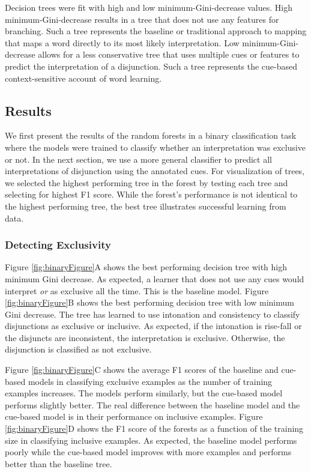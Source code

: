 \documentclass[
  english,
  ,man,floatsintext]{apa6}
\begin{document}
Decision trees were fit with high and low minimum-Gini-decrease values. High minimum-Gini-decrease results in a tree that does not use any features for branching. Such a tree represents the baseline or traditional approach to mapping that maps a word directly to its most likely interpretation. Low minimum-Gini-decrease allows for a less conservative tree that uses multiple cues or features to predict the interpretation of a disjunction. Such a tree represents the cue-based context-sensitive account of word learning.

\hypertarget{results-1}{%
\subsection{Results}\label{results-1}}

We first present the results of the random forests in a binary classification task where the models were trained to classify whether an interpretation was exclusive or not. In the next section, we use a more general classifier to predict all interpretations of disjunction using the annotated cues. For visualization of trees, we selected the highest performing tree in the forest by testing each tree and selecting for highest F1 score. While the forest's performance is not identical to the highest performing tree, the best tree illustrates successful learning from data.

\hypertarget{detecting-exclusivity}{%
\subsubsection{Detecting Exclusivity}\label{detecting-exclusivity}}

Figure \ref{fig:binaryFigure}A shows the best performing decision tree with high minimum Gini decrease. As expected, a learner that does not use any cues would interpret \emph{or} as exclusive all the time. This is the baseline model. Figure \ref{fig:binaryFigure}B shows the best performing decision tree with low minimum Gini decrease. The tree has learned to use intonation and consistency to classify disjunctions as exclusive or inclusive. As expected, if the intonation is rise-fall or the disjuncts are inconsistent, the interpretation is exclusive. Otherwise, the disjunction is classified as not exclusive.

Figure \ref{fig:binaryFigure}C shows the average F1 scores of the baseline and cue-based models in classifying exclusive examples as the number of training examples increases. The models perform similarly, but the cue-based model performs slightly better. The real difference between the baseline model and the cue-based model is in their performance on inclusive examples. Figure \ref{fig:binaryFigure}D shows the F1 score of the forests as a function of the training size in classifying inclusive examples. As expected, the baseline model performs poorly while the cue-based model improves with more examples and performs better than the baseline tree.
\end{document}
